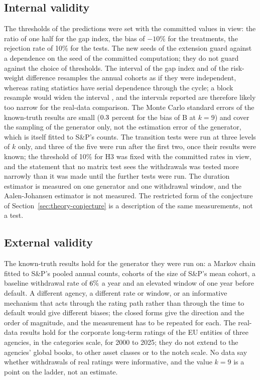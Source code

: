 \subsection{Internal validity}
\label{sec:limitations-internal}

The thresholds of the predictions were set with the committed values in view: the ratio of one half for the gap index, the bias of $-10\%$ for the treatments, the rejection rate of 10\% for the tests. The new seeds of the extension guard against a dependence on the seed of the committed computation; they do not guard against the choice of thresholds. The interval of the gap index and of the risk-weight difference resamples the annual cohorts as if they were independent, whereas rating statistics have serial dependence through the cycle; a block resample would widen the interval \citep{Kunsch_1989}, and the intervals reported are therefore likely too narrow for the real-data comparison. The Monte Carlo standard errors of the known-truth results are small ($0.3$ percent for the bias of B at $k=9$) and cover the sampling of the generator only, not the estimation error of the generator, which is itself fitted to S\&P's counts. The transition tests were run at three levels of $k$ only, and three of the five were run after the first two, once their results were known; the threshold of 10\% for H3 was fixed with the committed rates in view, and the statement that no matrix test sees the withdrawals was tested more narrowly than it was made until the further tests were run. The duration estimator is measured on one generator and one withdrawal window, and the Aalen-Johansen estimator is not measured. The restricted form of the conjecture of Section~\ref{sec:theory-conjecture} is a description of the same measurements, not a test.

\subsection{External validity}
\label{sec:limitations-external}

The known-truth results hold for the generator they were run on: a Markov chain fitted to S\&P's pooled annual counts, cohorts of the size of S\&P's mean cohort, a baseline withdrawal rate of $6\%$ a year and an elevated window of one year before default. A different agency, a different rate or window, or an informative mechanism that acts through the rating path rather than through the time to default would give different biases; the closed forms give the direction and the order of magnitude, and the measurement has to be repeated for each. The real-data results hold for the corporate long-term ratings of the EU entities of three agencies, in the categories scale, for 2000 to 2025; they do not extend to the agencies' global books, to other asset classes or to the notch scale. No data say whether withdrawals of real ratings were informative, and the value $k=9$ is a point on the ladder, not an estimate.

